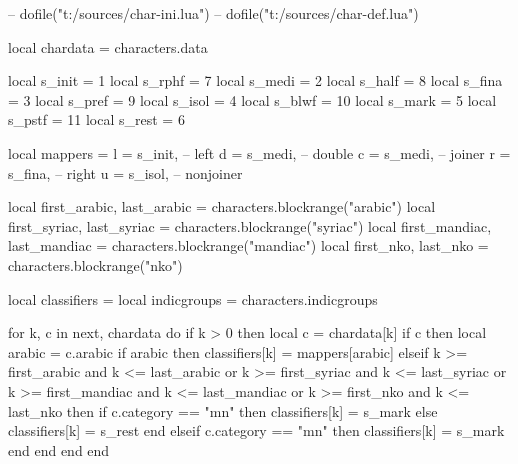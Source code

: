 


\startluacode

-- dofile("t:/sources/char-ini.lua")
-- dofile("t:/sources/char-def.lua")

local chardata   = characters.data

local s_init = 1    local s_rphf =  7
local s_medi = 2    local s_half =  8
local s_fina = 3    local s_pref =  9
local s_isol = 4    local s_blwf = 10
local s_mark = 5    local s_pstf = 11
local s_rest = 6

local mappers = {
    l = s_init,  -- left
    d = s_medi,  -- double
    c = s_medi,  -- joiner
    r = s_fina,  -- right
    u = s_isol,  -- nonjoiner
}

local first_arabic,  last_arabic  = characters.blockrange("arabic")
local first_syriac,  last_syriac  = characters.blockrange("syriac")
local first_mandiac, last_mandiac = characters.blockrange("mandiac")
local first_nko,     last_nko     = characters.blockrange("nko")

local classifiers = { }
local indicgroups = characters.indicgroups

for k, c in next, chardata do
    if k > 0 then
        local c = chardata[k]
        if c then
            local arabic = c.arabic
            if arabic then
                classifiers[k] = mappers[arabic]
            elseif k >= first_arabic  and k <= last_arabic  or k >= first_syriac  and k <= last_syriac  or
                   k >= first_mandiac and k <= last_mandiac or k >= first_nko     and k <= last_nko     then
                if c.category == "mn" then
                    classifiers[k] = s_mark
                else
                    classifiers[k] = s_rest
                end
            elseif c.category == "mn" then
                classifiers[k] = s_mark
            end
        end
    end
end

